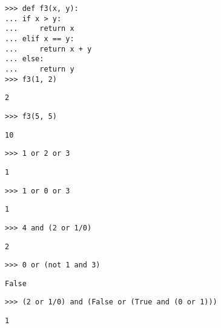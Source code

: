 \begin{lstlisting}
>>> def f3(x, y):
...	if x > y:
...		return x
...	elif x == y:
...		return x + y
...	else:
...		return y
>>> f3(1, 2)
\end{lstlisting}
\begin{solution}[.2in]
    \lstinline{2}
\end{solution}

\begin{lstlisting}
>>> f3(5, 5)
\end{lstlisting}
\begin{solution}[.2in]
    \lstinline{10}
\end{solution}

\begin{lstlisting}
>>> 1 or 2 or 3
\end{lstlisting}
\begin{solution}[.2in]
    \lstinline{1}
\end{solution}

\begin{lstlisting}
>>> 1 or 0 or 3
\end{lstlisting}
\begin{solution}[.2in]
    \lstinline{1}
\end{solution}

\begin{lstlisting}
>>> 4 and (2 or 1/0)
\end{lstlisting}
\begin{solution}[.2in]
    \lstinline{2}
\end{solution}

\begin{lstlisting}
>>> 0 or (not 1 and 3)
\end{lstlisting}
\begin{solution}[.2in]
    \lstinline{False}
\end{solution}

\begin{lstlisting}
>>> (2 or 1/0) and (False or (True and (0 or 1)))
\end{lstlisting}
\begin{solution}[.2in]
    \lstinline{1}
\end{solution}
